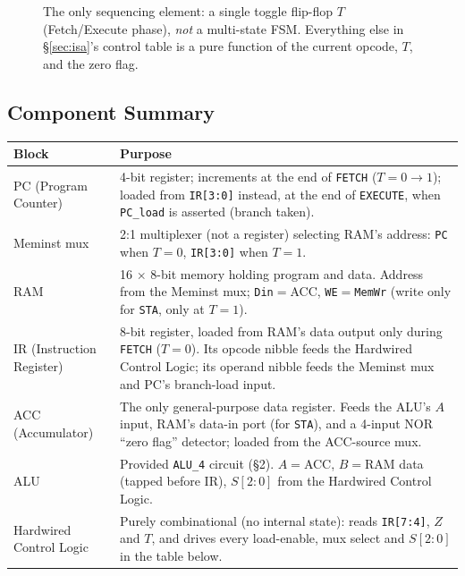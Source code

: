 \documentclass[11pt,a4paper]{article}
\begin{document}
\begin{figure}[h!]
\centering
{}
\caption{The only sequencing element: a single toggle flip-flop $T$
(Fetch/Execute phase), \emph{not} a multi-state FSM. Everything else in
\S\ref{sec:isa}'s control table is a pure function of the current opcode,
$T$, and the zero flag.}
\label{fig:phase}
\end{figure}

\subsection*{Component Summary}

\begin{center}
\begin{tabular}{@{}p{2.9cm}p{9.5cm}@{}}
\toprule
\textbf{Block} & \textbf{Purpose} \\
\midrule
PC (Program Counter) & 4-bit register; increments at the end of
\texttt{FETCH} ($T{=}0{\to}1$); loaded from \texttt{IR[3:0]} instead, at
the end of \texttt{EXECUTE}, when \texttt{PC\_load} is asserted (branch
taken). \\
Meminst mux & 2:1 multiplexer (not a register) selecting RAM's address:
\texttt{PC} when $T{=}0$, \texttt{IR[3:0]} when $T{=}1$. \\
RAM & 16 $\times$ 8-bit memory holding program and data. Address from the
Meminst mux; \texttt{Din}$=$ACC, \texttt{WE}$=$\texttt{MemWr} (write only
for \texttt{STA}, only at $T{=}1$). \\
IR (Instruction Register) & 8-bit register, loaded from RAM's data output
only during \texttt{FETCH} ($T{=}0$). Its opcode nibble feeds the
Hardwired Control Logic; its operand nibble feeds the Meminst mux and
PC's branch-load input. \\
ACC (Accumulator) & The only general-purpose data register. Feeds the
ALU's $A$ input, RAM's data-in port (for \texttt{STA}), and a 4-input NOR
``zero flag'' detector; loaded from the ACC-source mux. \\
ALU & Provided \texttt{ALU\_4} circuit (\S 2). $A{=}$ACC, $B{=}$RAM data
(tapped before IR), $S[2{:}0]$ from the Hardwired Control Logic. \\
Hardwired Control Logic & Purely combinational (no internal state):
reads \texttt{IR[7:4]}, $Z$ and $T$, and drives every load-enable, mux
select and $S[2{:}0]$ in the table below. \\
\bottomrule
\end{tabular}
\end{center}
\end{document}
